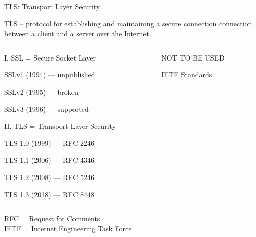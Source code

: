 \documentclass[usenames,dvipsnames, 9pt]{beamer}
\begin{document}
\begin{frame}{TLS: Transport Layer Security}

\Large
{\color{Orange}TLS -- } protocol for establishing and maintaining a secure connection connection between a client and a server over the Internet.
\vspace{10pt}
\begin{columns}
	\begin{column}{0.6\textwidth}
		I. SSL = Secure Socket Layer  
		\begin{itemize}
			{\large
			\item SSLv1 (1994) — unpublished 
			\item SSLv2 (1995) — broken
			\item SSLv3 (1996) — supported
			}
		\end{itemize}
	\pause 
	\vspace{10pt}
	II. TLS = Transport Layer Security
	\begin{itemize}
		{\large
		\item TLS 1.0 (1999) — RFC 2246
		\item TLS 1.1 (2006) — RFC 4346
		\item TLS 1.2 (2008) — RFC 5246
		\item TLS 1.3 (2018) — RFC 8448
	}
	\end{itemize}
	\end{column}

	\begin{column}{0.35\textwidth}
		{
			\LARGE
			{\color{Orange} NOT TO BE USED}
		}
		\vspace{55pt}
		
		{
			\huge
			{\color{Orange} IETF Standards}
		}
	\end{column}
\end{columns}

\vfill
\small
RFC = Request for Comments\\
IETF = Internet Engineering Task Force

\end{frame}
\end{document}
